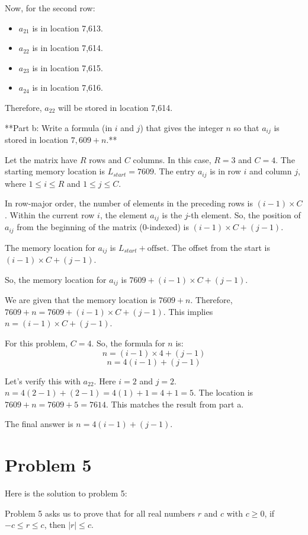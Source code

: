 \documentclass{article}
\begin{document}
Now, for the second row:
\begin{itemize}
    \item $a_{21}$ is in location 7,613.
    \item $a_{22}$ is in location 7,614.
    \item $a_{23}$ is in location 7,615.
    \item $a_{24}$ is in location 7,616.
\end{itemize}
Therefore, $a_{22}$ will be stored in location 7,614.

**Part b: Write a formula (in $i$ and $j$) that gives the integer $n$ so that $a_{ij}$ is stored in location $7,609 + n$.**

Let the matrix have $R$ rows and $C$ columns. In this case, $R=3$ and $C=4$.
The starting memory location is $L_{start} = 7609$.
The entry $a_{ij}$ is in row $i$ and column $j$, where $1 \le i \le R$ and $1 \le j \le C$.

In row-major order, the number of elements in the preceding rows is $(i-1) \times C$.
Within the current row $i$, the element $a_{ij}$ is the $j$-th element.
So, the position of $a_{ij}$ from the beginning of the matrix (0-indexed) is $(i-1) \times C + (j-1)$.

The memory location for $a_{ij}$ is $L_{start} + \text{offset}$.
The offset from the start is $(i-1) \times C + (j-1)$.

So, the memory location for $a_{ij}$ is $7609 + (i-1) \times C + (j-1)$.

We are given that the memory location is $7609 + n$.
Therefore, $7609 + n = 7609 + (i-1) \times C + (j-1)$.
This implies $n = (i-1) \times C + (j-1)$.

For this problem, $C=4$.
So, the formula for $n$ is:
$$ n = (i-1) \times 4 + (j-1) $$
$$ n = 4(i-1) + (j-1) $$

Let's verify this with $a_{22}$. Here $i=2$ and $j=2$.
$n = 4(2-1) + (2-1) = 4(1) + 1 = 4 + 1 = 5$.
The location is $7609 + n = 7609 + 5 = 7614$. This matches the result from part a.

The final answer is $\boxed{n = 4(i-1) + (j-1)}$.

\newpage

\section*{Problem 5}
Here is the solution to problem 5:

Problem 5 asks us to prove that for all real numbers $r$ and $c$ with $c \ge 0$, if $-c \le r \le c$, then $|r| \le c$.
\end{document}
